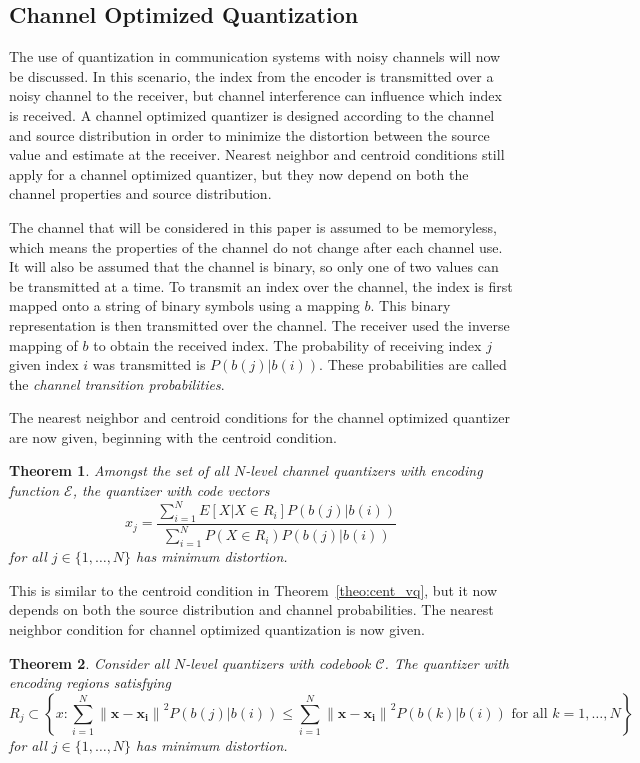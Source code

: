 \documentclass[10pt]{article}
\newtheorem{theorem}{Theorem}[section]
\begin{document}
\subsection{Channel Optimized Quantization}
\label{sec:channel_optimized}
The use of quantization in communication systems with noisy channels will now be discussed. In this scenario, the index from the encoder is transmitted over a noisy channel to the receiver, but channel interference can influence which index is received. A channel optimized quantizer is designed according to the channel and source distribution in order to minimize the distortion between the source value and estimate at the receiver. Nearest neighbor and centroid conditions still apply for a channel optimized quantizer, but they now depend on both the channel properties and source distribution.

The channel that will be considered in this paper is assumed to be memoryless, which means the properties of the channel do not change after each channel use. It will also be assumed that the channel is binary, so only one of two values can be transmitted at a time. To transmit an index over the channel, the index is first mapped onto a string of binary symbols using a mapping $b$. This binary representation is then transmitted over the channel. The receiver used the inverse mapping of $b$ to obtain the received index. The probability of receiving index $j$ given index $i$ was transmitted is $P(b(j)|b(i))$. These probabilities are called the \emph{channel transition probabilities}.

The nearest neighbor and centroid conditions for the channel optimized quantizer are now given, beginning with the centroid condition.

\begin{theorem}
\label{theo:cent_covq}
Amongst the set of all $N$-level channel quantizers with encoding function $\mathcal{E}$, the quantizer with code vectors
\begin{equation}
  \label{eq:cent_covq}
  x_j = \frac{\sum_{i=1}^N E[X | X \in R_i]P(b(j)|b(i))}{\sum_{i=1}^N P( X \in R_i)P(b(j)|b(i))} 
\end{equation}
for all $j \in \{1,\ldots,N\}$ has minimum distortion.
\end{theorem}
This is similar to the centroid condition in Theorem~\ref{theo:cent_vq}, but it now depends on both the source distribution and channel probabilities. The nearest neighbor condition for channel optimized quantization is now given.

\begin{theorem}
Consider all $N$-level quantizers with codebook $\mathcal{C}$. The quantizer with encoding regions satisfying
\begin{equation}
R_j \subset \left\{x : \sum_{i=1}^N {\| \mathbf{x} - \mathbf{x_i} \|}^2P(b(j)|b(i)) \le \sum_{i=1}^N {\| \mathbf{x} - \mathbf{x_i} \|}^2P(b(k)|b(i)) \text{ for all } k = 1,\ldots,N \right\}
\end{equation}
for all $j \in \{1,\ldots,N\}$ has minimum distortion.
\end{theorem}
\end{document}
